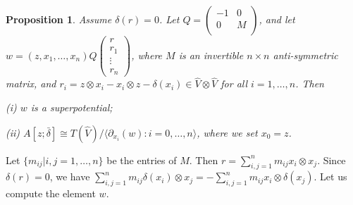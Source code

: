 \documentclass[a4paper]{amsart}
\newtheorem{prop}[thm]{Proposition}
\begin{document}
\begin{prop} \label{prop3} Assume $\delta(r)=0$. Let $Q=\left(
                                   \begin{array}{ccc}
                                     -1 & 0  \\
                                     0 & M \\
                                   \end{array}
                                 \right)$, and let        $w=(z,x_1,\dots,x_n)Q\left(
                                                                          \begin{array}{c}
                                                                            r \\
                                                                            r_1 \\
                                                                            \vdots \\
                                                                            r_n
                                                                          \end{array}
                                                                        \right)$, where $M$ is an invertible $n\times n$ anti-symmetric matrix, and $r_i=z{\otimes} x_i-x_i{\otimes} z-\delta(x_i)\in \widehat{V}{\otimes} \widehat{V}$ for all $i=1,\dots,n$. Then

{\rm (i)} $w$ is a superpotential;

{\rm (ii)} $A[z;\bar{\delta}]\cong T(\widehat{V})/\langle \partial_{x_i}(w):i=0,\dots,n\rangle$, where we set $x_0=z$.
 \end{prop}
\proof Let $\{m_{ij}|i,j=1,\dots,n\}$ be the entries of $M$. Then $r=\sum_{i,j=1}^nm_{ij}x_i{\otimes} x_j$. Since $\delta(r)=0$, we have $\displaystyle\sum_{i,j=1}^nm_{ij}\delta(x_i){\otimes} x_j=-\sum_{i,j=1}^nm_{ij}x_i{\otimes} \delta(x_j)$.  Let us compute the element $w$.
\end{document}

